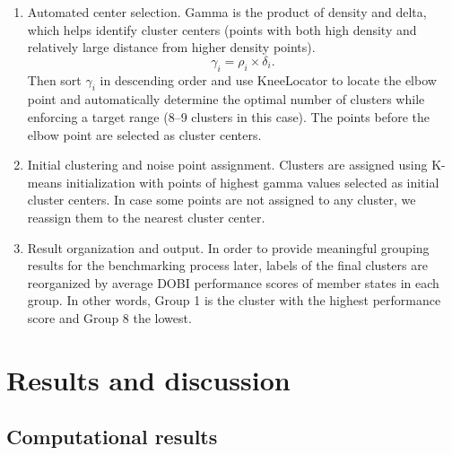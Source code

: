 \documentclass{article}
\begin{document}
\begin{enumerate}[label=\textbf{Step}~\arabic*.]
\item Automated center selection.
Gamma is the product of density and delta, which helps identify cluster centers (points with both high density and relatively large distance from higher density points).
\[
\gamma_{i} = \rho_{i} \times \delta_{i}.
\]
Then sort $\gamma_{i}$ in descending order and use KneeLocator to locate the elbow point and automatically determine the optimal number of clusters while enforcing a target range (8--9 clusters in this case). The points before the elbow point are selected as cluster centers.

\item Initial clustering and noise point assignment.
Clusters are assigned using K-means initialization with points of highest gamma values selected as initial cluster centers. In case some points are not assigned to any cluster, we reassign them to the nearest cluster center.

\item Result organization and output.
In order to provide meaningful grouping results for the benchmarking process later, labels of the final clusters are reorganized by average DOBI performance scores of member states in each group. In other words, Group 1 is the cluster with the highest performance score and Group 8 the lowest.
\end{enumerate}

\section{Results and discussion}

\subsection{Computational results}
\end{document}
